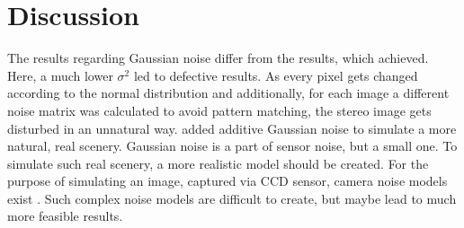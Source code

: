 \begin{table}[h!]
\centering
{}
\caption[Result table for runtime of SVDDD]{Result table for runtime of SVDDD}
\end{table}










\section{Discussion}




The results regarding Gaussian noise differ from the results, which \citeauthor{richardt2010real} \citep{richardt2010real} achieved.
Here, a much lower $\sigma^2$ led to defective results.
As every pixel gets changed according to the normal distribution and additionally, for each image a different noise matrix was calculated to avoid pattern matching, the stereo image gets disturbed in an unnatural way.
\citeauthor{richardt2010real} added additive Gaussian noise to simulate a more natural, real scenery.
Gaussian noise is a part of sensor noise, but a small one.
To simulate such real scenery, a more realistic model should be created.
For the purpose of simulating an image, captured via CCD sensor, camera noise models exist \citep{liu2006noise}.
Such complex noise models are difficult to create, but maybe lead to much more feasible results.


























